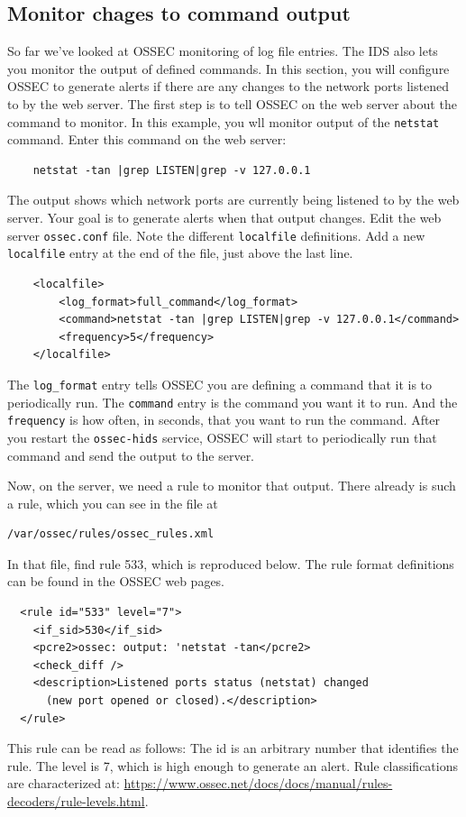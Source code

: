 \subsection{Monitor chages to command output}
So far we've looked at OSSEC monitoring of log file entries.  The IDS also lets you monitor the output of defined commands.
In this section, you will configure OSSEC to generate alerts if there are any changes to the network ports listened to by 
the web server.  The first step is to tell OSSEC on the web server about the command to monitor.  In this example, you wll 
monitor output of the {\tt netstat} command.  Enter this command on the web server:
\begin{verbatim}
    netstat -tan |grep LISTEN|grep -v 127.0.0.1
\end{verbatim}
\noindent The output shows which network ports are currently being listened to by the web server.  Your goal is to generate 
alerts when that output changes.  Edit the web server {\tt ossec.conf} file.  Note the different {\tt localfile} definitions.
Add a new {\tt localfile} entry at the end of the file, just above the last line.
\begin{verbatim}
    <localfile>
        <log_format>full_command</log_format>
        <command>netstat -tan |grep LISTEN|grep -v 127.0.0.1</command>
        <frequency>5</frequency>
    </localfile>
\end{verbatim}
\noindent  The {\tt log\_format} entry tells OSSEC you are defining a command that it is to periodically run.
The {\tt command} entry is the command you want it to run.  And the {\tt frequency} is how often, in seconds, that
you want to run the command.  After you restart the {\tt ossec-hids} service, OSSEC will start to periodically run
that command and send the output to the server.

Now, on the server, we need a rule to monitor that output.  There already is such a rule, which you can see in the
file at
\begin{verbatim}
/var/ossec/rules/ossec_rules.xml
\end{verbatim}

\noindent In that file, find rule 533, which is reproduced below.  
The rule format definitions can be found in the OSSEC web pages.  
\begin{verbatim}
  <rule id="533" level="7">
    <if_sid>530</if_sid>
    <pcre2>ossec: output: 'netstat -tan</pcre2>
    <check_diff />
    <description>Listened ports status (netstat) changed 
      (new port opened or closed).</description>
  </rule>

\end{verbatim}
\noindent This rule can be read as follows:  The id is an arbitrary number that identifies the rule.
The level is 7, which is high enough to generate an alert.  Rule classifications
are characterized at: \url{https://www.ossec.net/docs/docs/manual/rules-decoders/rule-levels.html}.

